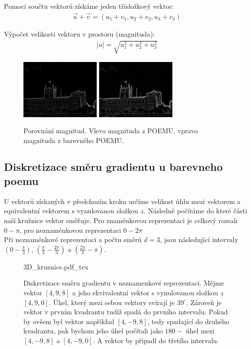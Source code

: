 \documentclass{report}
\begin{document}
Pomocí součtu vektorú získáme jeden třísložkový vektor:
\begin{align}
   \label{soucet_vektrou} \vec{u} + \vec{v} = (u_1 + v_1, u_2 + v_2, u_3 + v_3 )
\end{align} 

Výpočet velikosti vektoru v prostoru (magnituda):
\begin{align}
   \label{velikost_vektoru_v_prostoru} |u| = \sqrt{u_1^2 + u_2^2 + u_3^2}
\end{align} 

\begin{figure}[H]
		\centering
		\includegraphics[width=150px]{./img/magnitude.jpg}	
		\includegraphics[width=150px]{./img/magnitude_3.jpg}	
		\caption{Porovnání magnitud. Vlevo magnituda z POEMU, vpravo magnituda z barevného POEMU.}
\end{figure}


\subsection{Diskretizace směru gradientu u barevneho poemu}
U vektorů získaných v předchozím kroku určíme velikost úhlu mezi vektorem a equivalentní vektorem s vynulovanou složkou $z$. Následně počítáme do které části naší kružnice vektor směřuje. Pro znaménkovou reprezentaci je celkový rozsah $0 - \pi$, pro neznaménkovou reprezentaci $0 - 2\pi$
\\
Při neznaménkové reprezentaci a počtu směrů $d = 3$, jsou následující intervaly $\left(0 - \frac{\pi}{3}\right)$, $\left(\frac{\pi}{3} - \frac{2\pi}{3}\right)$ a  $\left(\frac{2\pi}{3} - \pi\right)$.

\begin{figure}[H]
    \centering    
    \def\svgwidth{\columnwidth}
	{3D_kruznice.pdf_tex}    
    \caption{Diskretizace směru gradientu v neznamenkové reprezentaci. Mějme vektor $[4, 9, 8]$ a jeho ekvivalentní vektor s vynulovanou složkou $z$ $[4,9, 0]$. Úhel, který mezi sebou vektory svírají je $39 ^\circ$. Zároveň je vektor v prvním kvadrantu tudíž spadá do prvního intervalu. Pokud by ovšem byl vektor například $[4, -9, 8]$, tedy spadající do druhého kvadrantu, pak bychom jeho úhel počítali jako $180 -$ úhel mezi $[4, -9, 8]$ a $[4, -9, 0]$. A vektor by připadl do třetího intervalu.}
    \label{fig: diskretizace3D}
\end{figure}
\end{document}
